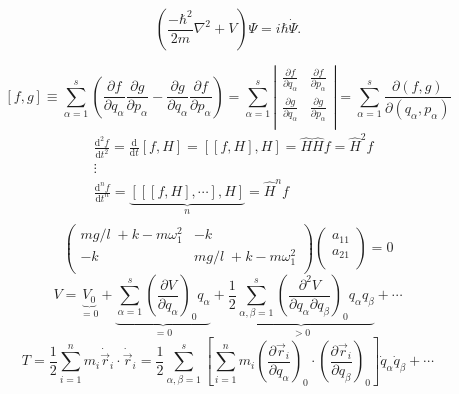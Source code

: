 \documentclass{article}
\begin{document}
\[\left(\frac{-\hbar^2}{2m}\nabla^2+V\right)\Psi=i\hbar\dot{\Psi}.\]

\[\left[ f,g \right]\equiv \sum\limits_{\alpha =1}^{s}{\left( \frac{\partial f}{\partial {{q}_{\alpha }}}\frac{\partial g}{\partial {{p}_{\alpha }}}-\frac{\partial g}{\partial {{q}_{\alpha }}}\frac{\partial f}{\partial {{p}_{\alpha }}} \right)}=\sum\limits_{\alpha =1}^{s}{\left| \begin{matrix}
	\frac{\partial f}{\partial {{q}_{\alpha }}} & \frac{\partial f}{\partial {{p}_{\alpha }}}  \\
	\frac{\partial g}{\partial {{q}_{\alpha }}} & \frac{\partial g}{\partial {{p}_{\alpha }}}  \\
	\end{matrix} \right|}=\sum\limits_{\alpha =1}^{s}{\frac{\partial \left( f,g \right)}{\partial \left( {{q}_{\alpha }},{{p}_{\alpha }} \right)}}\]
\[\begin{split}
& \frac{{{\text{d}}^{2}}f}{\text{d}{{t}^{2}}}=\frac{\text{d}}{\text{d}t}\left[ f,H \right]=\left[ \left[ f,H \right],H \right]=\hat{H}\hat{H}f={{{\hat{H}}}^{2}}f \\ 
& \vdots  \\ 
& \frac{{{\text{d}}^{n}}f}{\text{d}{{t}^{n}}}=\underbrace{\left[ \left[ \left[ f,H \right],\cdots  \right],H \right]}_{n}={{{\hat{H}}}^{n}}f  \\
\end{split}\]
\[\left( \begin{matrix}
{mg}/{l}\;+k-m\omega _{1}^{2} & -k  \\
-k & {mg}/{l}\;+k-m\omega _{1}^{2}  \\
\end{matrix} \right)\left( \begin{matrix}
{{a}_{11}}  \\
{{a}_{21}}  \\
\end{matrix} \right)=0\]
\[V=\underbrace{{{V}_{0}}}_{=0}+\underbrace{\sum\limits_{\alpha =1}^{s}{{{\left( \frac{\partial V}{\partial {{q}_{\alpha }}} \right)}_{0}}{{q}_{\alpha }}}}_{=0}+\underbrace{\frac{1}{2}\sum\limits_{\alpha ,\beta =1}^{s}{{{\left( \frac{{{\partial }^{2}}V}{\partial {{q}_{\alpha }}\partial {{q}_{\beta }}} \right)}_{0}}{{q}_{\alpha }}{{q}_{\beta }}}}_{>0}+\cdots \]
\[T=\frac{1}{2}\sum\limits_{i=1}^{n}{{{m}_{i}}{{{\dot{\vec r}}}_{i}}\cdot {{{\dot{\vec r}}}_{i}}}=\frac{1}{2}\sum\limits_{\alpha ,\beta =1}^{s}{\left[ \sum\limits_{i=1}^{n}{{{m}_{i}}{{\left( \frac{\partial {{\vec r}_{i}}}{\partial {{q}_{\alpha }}} \right)}_{0}}\cdot {{\left( \frac{\partial {{\vec r}_{i}}}{\partial {{q}_{\beta }}} \right)}_{0}}} \right]{{{\dot{q}}}_{\alpha }}{{{\dot{q}}}_{\beta }}}+\cdots \]
\end{document}
